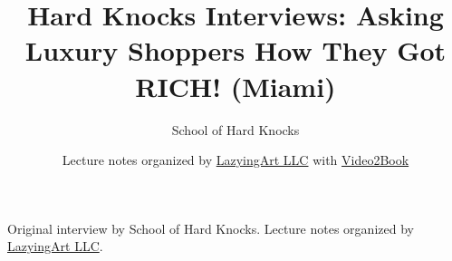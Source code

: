 \documentclass[11pt,oneside]{book}
\begin{document}
\frontmatter
\title{Hard Knocks Interviews: Asking Luxury Shoppers How They Got RICH! (Miami)}
\author{School of Hard Knocks}
\date{Lecture notes organized by \href{https://lazying.art}{LazyingArt LLC} with \href{https://github.com/lachlanchen/Video2Book}{Video2Book}}
\maketitle
\begin{center}
\small Original interview by School of Hard Knocks. Lecture notes organized by \href{https://lazying.art}{LazyingArt LLC}.
\end{center}
\clearpage
\mainmatter

\end{document}
